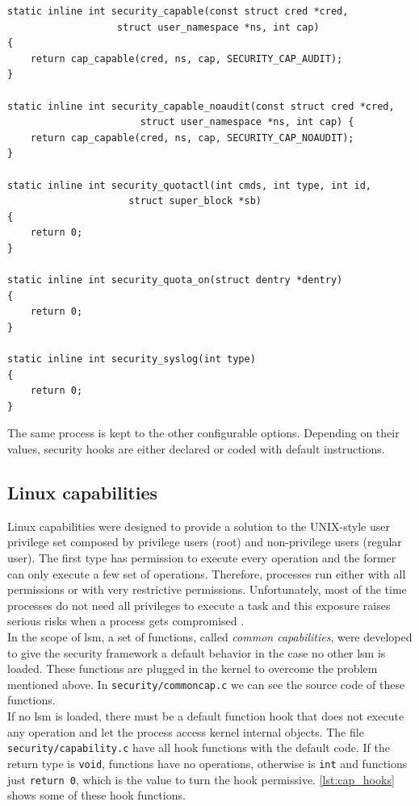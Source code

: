 \begin{lstlisting}[frame=none, numbers=none, caption=Default security functions (Linux kernel v3.11), label=lst:default_hooks]
static inline int security_capable(const struct cred *cred,
				   struct user_namespace *ns, int cap)
{
	return cap_capable(cred, ns, cap, SECURITY_CAP_AUDIT);
}

static inline int security_capable_noaudit(const struct cred *cred,
					   struct user_namespace *ns, int cap) {
	return cap_capable(cred, ns, cap, SECURITY_CAP_NOAUDIT);
}

static inline int security_quotactl(int cmds, int type, int id,
				     struct super_block *sb)
{
	return 0;
}

static inline int security_quota_on(struct dentry *dentry)
{
	return 0;
}

static inline int security_syslog(int type)
{
	return 0;
}
\end{lstlisting}

\noindent
The same process is kept to the other configurable options. Depending on their values, security hooks are either declared or coded with default instructions.

\subsection{Linux capabilities}
\label{sec:linux_capabilities}

Linux capabilities were designed to provide a solution to the UNIX-style user privilege set composed by privilege users (root) and non-privilege users (regular user). The first type has permission to execute every operation and the former can only execute a few set of operations. Therefore, processes run either with all permissions or with very restrictive permissions. Unfortunately, most of the time processes do not need all privileges to execute a task and this exposure raises serious risks when a process gets compromised \cite{Wiki:Capabilities}.\\

\noindent
In the scope of \gls{lsm}, a set of functions, called \textit{common capabilities}, were developed to give the security framework a default behavior in the case no other \gls{lsm} is loaded. These functions are plugged in the kernel to overcome the problem mentioned above. In \texttt{security/commoncap.c} we can see the source code of these functions.\\

\noindent
If no \gls{lsm} is loaded, there must be a default function hook that does not execute any operation and let the process access kernel internal objects. The file \texttt{security/capability.c} have all hook functions with the default code. If the return type is \texttt{void}, functions have no operations, otherwise is \texttt{int} and functions just \texttt{return 0}, which is the value to turn the hook permissive. \autoref{lst:cap_hooks} shows some of these hook functions.


